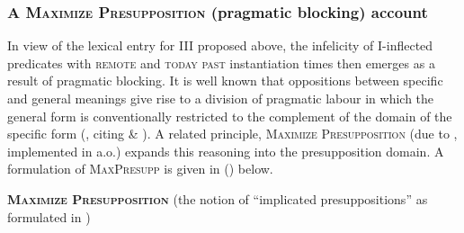 \begin{figure}[h]
	
\end{figure}

\subsubsection[\textsc{\textit{MaxPresupp 1}}: A blocking account]{A \textsc{Maximize Presupposition} (pragmatic blocking) account}\label{sec:MP1}

In view of the lexical entry for \gls{III} proposed above, the infelicity of \gls{I}-inflected predicates with \textsc{remote} and \textsc{today past} instantiation times then emerges as a result of pragmatic blocking. It is well known that oppositions between specific and general meanings give rise to a division of pragmatic labour in which the general form is conventionally restricted to the complement of the domain of the specific form (\citealp{Deo2015}, citing \citealp{Horn1984} \& \citealp{Horn2012a}). A related principle, \textsc{Maximize Presupposition} (due to \citealp{Heim1991}, implemented in \citealp{Sauerland2009,Ippolito2003} a.o.) expands this reasoning into the presupposition domain. A formulation of \textsc{MaxPresupp} is given in (\nextx) below.

\pex \textbf{\textsc{Maximize Presupposition} }(the notion of ``implicated presuppositions'' as formulated in \citealp{Sauerland2002,Sauerland2004a})

